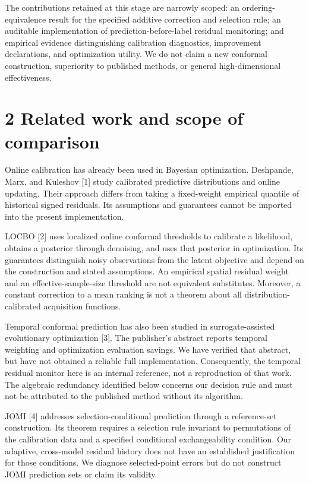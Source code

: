 \documentclass[11pt,a4paper]{article}
\begin{document}
The contributions retained at this stage are narrowly scoped: an
ordering-equivalence result for the specified additive correction and
selection rule; an auditable implementation of prediction-before-label
residual monitoring; and empirical evidence distinguishing calibration
diagnostics, improvement declarations, and optimization utility. We do
not claim a new conformal construction, superiority to published
methods, or general high-dimensional effectiveness.

\hypertarget{related-work-and-scope-of-comparison}{%
\section{2 Related work and scope of
comparison}\label{related-work-and-scope-of-comparison}}

Online calibration has already been used in Bayesian optimization.
Deshpande, Marx, and Kuleshov {[}1{]} study calibrated predictive
distributions and online updating. Their approach differs from taking a
fixed-weight empirical quantile of historical signed residuals. Its
assumptions and guarantees cannot be imported into the present
implementation.

LOCBO {[}2{]} uses localized online conformal thresholds to calibrate a
likelihood, obtains a posterior through denoising, and uses that
posterior in optimization. Its guarantees distinguish noisy observations
from the latent objective and depend on the construction and stated
assumptions. An empirical spatial residual weight and an
effective-sample-size threshold are not equivalent substitutes.
Moreover, a constant correction to a mean ranking is not a theorem about
all distribution-calibrated acquisition functions.

Temporal conformal prediction has also been studied in
surrogate-assisted evolutionary optimization {[}3{]}. The publisher's
abstract reports temporal weighting and optimization evaluation savings.
We have verified that abstract, but have not obtained a reliable full
implementation. Consequently, the temporal residual monitor here is an
internal reference, not a reproduction of that work. The algebraic
redundancy identified below concerns our decision rule and must not be
attributed to the published method without its algorithm.

JOMI {[}4{]} addresses selection-conditional prediction through a
reference-set construction. Its theorem requires a selection rule
invariant to permutations of the calibration data and a specified
conditional exchangeability condition. Our adaptive, cross-model
residual history does not have an established justification for those
conditions. We diagnose selected-point errors but do not construct JOMI
prediction sets or claim its validity.
\end{document}
